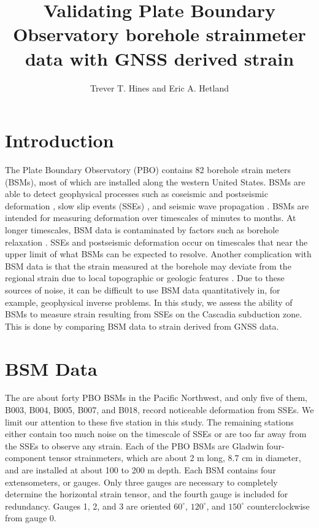 \documentclass[10pt,a4paper]{article}
\title{Validating Plate Boundary Observatory borehole strainmeter data with GNSS derived strain}
\author{Trever T. Hines and Eric A. Hetland}
\begin{document}
\maketitle


\section{Introduction}\label{sec:Introduction}
The Plate Boundary Observatory (PBO) contains 82 borehole strain meters (BSMs), most of which are installed along the western United States. BSMs are able to detect geophysical processes such as coseismic and postseismic deformation \citep[e.g.,][]{Langbein2006,Langbein2015}, slow slip events (SSEs) \citep[e.g.,][]{Dragert2011}, and seismic wave propagation \citep{Barbour2017}. BSMs are intended for measuring deformation over timescales of minutes to months. At longer timescales, BSM data is contaminated by factors such as borehole relaxation \citep{Gladwin1987}. SSEs and postseismic deformation occur on timescales that near the upper limit of what BSMs can be expected to resolve. Another complication with BSM data is that the strain measured at the borehole may deviate from the regional strain due to local topographic or geologic features \citep{Berger1976}. Due to these sources of noise, it can be difficult to use BSM data quantitatively in, for example,  geophysical inverse problems. In this study, we assess the ability of BSMs to measure strain resulting from SSEs on the Cascadia subduction zone. This is done by comparing BSM data to strain derived from GNSS data. 

\section{BSM Data}
The are about forty PBO BSMs in the Pacific Northwest, and only five of them, B003, B004, B005, B007, and B018, record noticeable deformation from SSEs. We limit our attention to these five station in this study.  The remaining stations either contain too much noise on the timescale of SSEs or are too far away from the SSEs to observe any strain. Each of the PBO BSMs are Gladwin four-component tensor strainmeters, which are about 2 m long, 8.7 cm in diameter, and are installed at about 100 to 200 m depth. Each BSM contains four extensometers, or gauges. Only three gauges are necessary to completely determine the horizontal strain tensor, and the fourth gauge is included for redundancy. Gauges 1, 2, and 3 are oriented $60^\circ$, $120^\circ$, and $150^\circ$ counterclockwise from gauge 0.   
\end{document}
